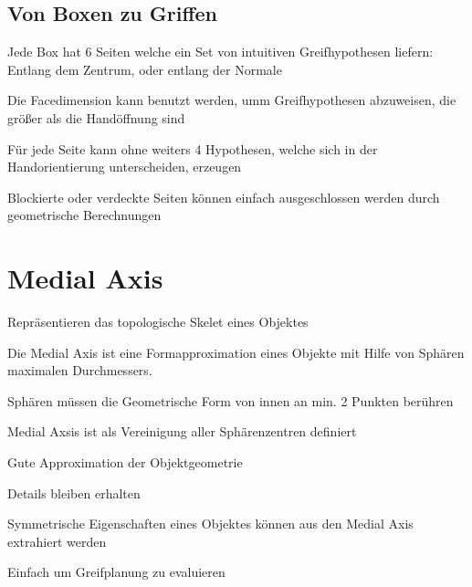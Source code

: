 \subsection{Von Boxen zu Griffen}
\begin{compactitem}
    \item Jede Box hat 6 Seiten welche ein Set von intuitiven Greifhypothesen liefern:
    Entlang dem Zentrum, oder entlang der Normale
    \item Die Facedimension kann benutzt werden, umm Greifhypothesen abzuweisen, die
    größer als die Handöffnung sind
    \item Für jede Seite kann ohne weiters 4 Hypothesen, welche sich in der Handorientierung
    unterscheiden, erzeugen
    \item Blockierte oder verdeckte Seiten können einfach ausgeschlossen werden durch
    geometrische Berechnungen
\end{compactitem}

\section{Medial Axis}
\begin{compactitem}
    \item Repräsentieren das topologische Skelet eines Objektes
    \item Die Medial Axis ist eine Formapproximation eines Objekte mit Hilfe von
     Sphären maximalen Durchmessers.
    \item Sphären müssen die Geometrische Form von innen an min. 2 Punkten berühren
    \item Medial Axsis ist als Vereinigung aller Sphärenzentren definiert

\end{compactitem}
\begin{compactitem}
    \item Gute Approximation der Objektgeometrie
    \item Details bleiben erhalten
    \item Symmetrische Eigenschaften eines Objektes können aus den Medial Axis
    extrahiert werden
    \item Einfach um Greifplanung zu evaluieren
\end{compactitem}

